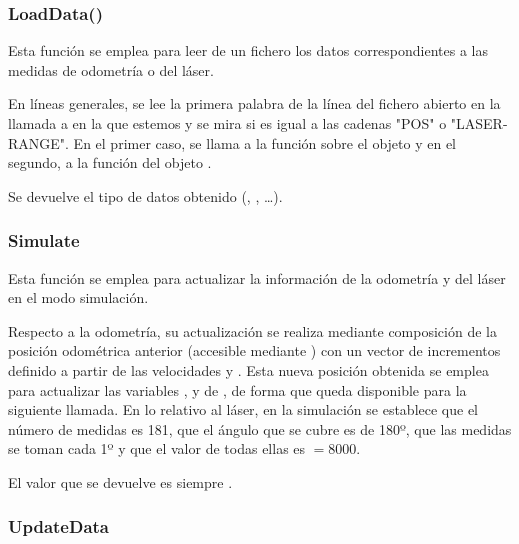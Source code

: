 \subsubsection{LoadData()}

\noindent
{}

\noindent
Esta función se emplea para leer de un fichero los datos correspondientes a las medidas de odometría o del láser.

\noindent
En líneas generales, se lee la primera palabra de la línea del fichero abierto en la llamada a  en la que estemos y se mira si es igual a las cadenas "POS" o "LASER-RANGE". En el primer caso, se llama a la función  sobre el objeto  y en el segundo, a la función  del objeto .

\noindent
Se devuelve el tipo de datos obtenido (, , \ldots).

\subsubsection{Simulate}

\noindent
{}

\noindent
Esta función se emplea para actualizar la información de la odometría y del láser en el modo simulación.

\noindent
Respecto a la odometría, su actualización se realiza mediante composición de la posición odométrica anterior (accesible mediante ) con un vector de incrementos definido a partir de las velocidades  y . Esta nueva posición obtenida se emplea para actualizar las variables ,  y  de , de forma que queda disponible para la siguiente llamada. En lo relativo al láser, en la simulación se establece que el número de medidas es 181, que el ángulo que se cubre es de 180º, que las medidas se toman cada 1º y que el valor de todas ellas es  $= 8000$.

\noindent
El valor que se devuelve es siempre .

\subsubsection{UpdateData}

\noindent
{}

